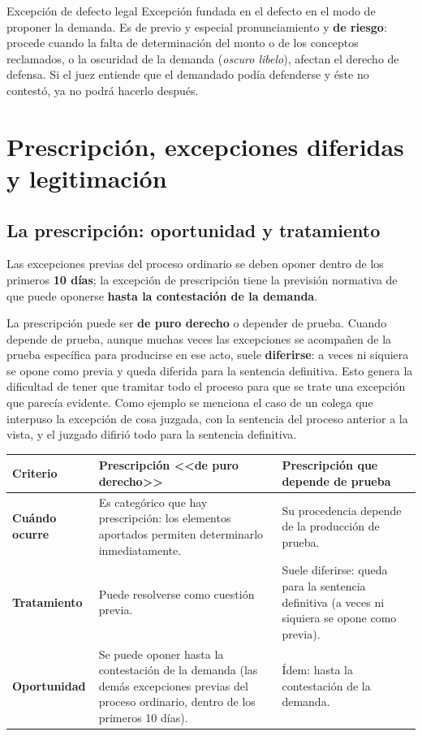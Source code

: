 \documentclass[12pt,oneside]{book}
\begin{document}
\begin{definition}{Excepci\'on de defecto legal}
Excepci\'on fundada en el defecto en el modo de proponer la demanda. Es de previo y especial pronunciamiento y \textbf{de riesgo}: procede cuando la falta de determinaci\'on del monto o de los conceptos reclamados, o la oscuridad de la demanda (\emph{oscuro libelo}), afectan el derecho de defensa. Si el juez entiende que el demandado pod\'ia defenderse y \'este no contest\'o, ya no podr\'a hacerlo despu\'es.
\end{definition}

\section{Prescripci\'on, excepciones diferidas y legitimaci\'on}

\subsection{La prescripci\'on: oportunidad y tratamiento}

Las excepciones previas del proceso ordinario se deben oponer dentro de los primeros \textbf{10 d\'ias}; la excepci\'on de prescripci\'on tiene la previsi\'on normativa de que puede oponerse \textbf{hasta la contestaci\'on de la demanda}.

La prescripci\'on puede ser \textbf{de puro derecho} o depender de prueba. Cuando depende de prueba, aunque muchas veces las excepciones se acompa\~nen de la prueba espec\'ifica para producirse en ese acto, suele \textbf{diferirse}: a veces ni siquiera se opone como previa y queda diferida para la sentencia definitiva. Esto genera la dificultad de tener que tramitar todo el proceso para que se trate una excepci\'on que parec\'ia evidente. Como ejemplo se menciona el caso de un colega que interpuso la excepci\'on de cosa juzgada, con la sentencia del proceso anterior a la vista, y el juzgado difiri\'o todo para la sentencia definitiva.

\begin{table}[H]
\centering
\small
\begin{tabularx}{\textwidth}{>{\raggedright\arraybackslash}p{}>{\raggedright\arraybackslash}X>{\raggedright\arraybackslash}X}
\toprule
\textbf{Criterio} & \textbf{Prescripci\'on <<de puro derecho>>} & \textbf{Prescripci\'on que depende de prueba} \\
\midrule
\textbf{Cu\'ando ocurre} & Es categ\'orico que hay prescripci\'on: los elementos aportados permiten determinarlo inmediatamente. & Su procedencia depende de la producci\'on de prueba. \\
\addlinespace
\textbf{Tratamiento} & Puede resolverse como cuesti\'on previa. & Suele diferirse: queda para la sentencia definitiva (a veces ni siquiera se opone como previa). \\
\addlinespace
\textbf{Oportunidad} & Se puede oponer hasta la contestaci\'on de la demanda (las dem\'as excepciones previas del proceso ordinario, dentro de los primeros 10 d\'ias). & \'Idem: hasta la contestaci\'on de la demanda. \\
\bottomrule
\end{tabularx}
\end{table}
\end{document}
